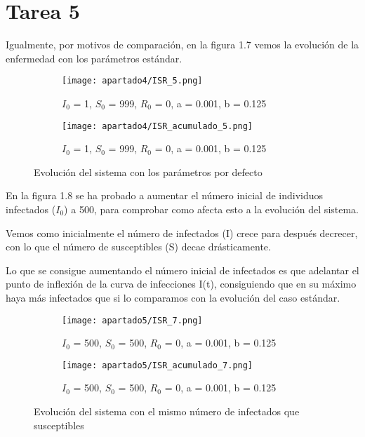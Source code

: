 \newpage

\section{Tarea 5}

Igualmente, por motivos de comparación, en la figura 1.7 vemos la evolución de la enfermedad con los parámetros estándar.

\begin{figure}[H]
	\centering
	\begin{subfigure}[b]{0.8\textwidth}
		\centering
		\texttt{[image: apartado4/ISR\_5.png]}
		\caption{$I_0$ = 1, $S_0$ = 999, $R_0$ = 0, a = 0.001, b = 0.125}
	\end{subfigure}
	\hfill
	\begin{subfigure}[b]{0.8\textwidth}
		\centering
		\texttt{[image: apartado4/ISR\_acumulado\_5.png]}
		\caption{$I_0$ = 1, $S_0$ = 999, $R_0$ = 0, a = 0.001, b = 0.125}
	\end{subfigure}
	\caption{Evolución del sistema con los parámetros por defecto}
\end{figure}

\newpage

En la figura 1.8 se ha probado a aumentar el número inicial de individuos infectados ($I_0$) a 500, para comprobar como afecta esto a la evolución del sistema.

Vemos como inicialmente el número de infectados (I) crece para después decrecer, con lo que el número de susceptibles (S) decae drásticamente.

Lo que se consigue aumentando el número inicial de infectados es que adelantar el punto de inflexión de la curva de infecciones I(t), consiguiendo que en su máximo haya más infectados que si lo comparamos con la evolución del caso estándar.

\begin{figure}[H]
	\centering
	\begin{subfigure}[b]{0.8\textwidth}
		\centering
		\texttt{[image: apartado5/ISR\_7.png]}
		\caption{$I_0$ = 500, $S_0$ = 500, $R_0$ = 0, a = 0.001, b = 0.125}
	\end{subfigure}
	\hfill
	\begin{subfigure}[b]{0.8\textwidth}
		\centering
		\texttt{[image: apartado5/ISR\_acumulado\_7.png]}
		\caption{$I_0$ = 500, $S_0$ = 500, $R_0$ = 0, a = 0.001, b = 0.125}
	\end{subfigure}
	\caption{Evolución del sistema con el mismo número de infectados que susceptibles}
\end{figure}

